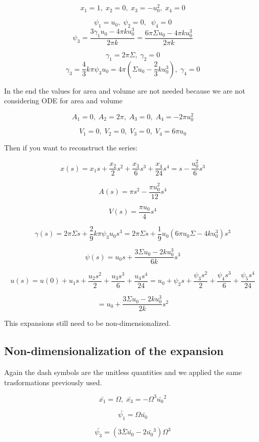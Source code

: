\documentclass[12pt]{article}
\begin{document}
$$
x_1 = 1 ,\; x_2 = 0 ,\; x_3 = - u_0^2 ,\; x_4 = 0
$$


$$
\psi_1 = u_0  ,\; \psi_2 = 0 ,\; \; \psi_4 = 0
$$
$$
\psi_3 = \frac{3\gamma_1 u_0 - 4 \pi k u_0^3}{2 \pi k } = \frac{6 \pi \Sigma u_0 - 4 \pi k u_0^3}{2 \pi k }
$$


$$
\gamma_1 = 2 \pi \Sigma ,\; \gamma_2 = 0 
$$
$$
\gamma_3 = \frac{4}{3} k \pi \psi_3 u_0 = 4 \pi (\Sigma u_0 - \frac{2}{3} k u_0^3) ,\; \gamma_4 = 0
$$

\alert{In the end the values for area and volume are not needed because we are not considering ODE for area and volume}

$$
A_1 = 0 ,\; A_2 =  2 \pi ,\; A_3 = 0 ,\; A_4 = - 2 \pi u_0^2
$$

$$
V_1 = 0 ,\; V_2 = 0 ,\; V_3 = 0 ,\; V_4 = 6 \pi u_0
$$


Then if you want to reconstruct the series:


$$
x(s)=x_1 s+\frac{x_2}{2}s^2+\frac{x_3}{6}s^3+\frac{x_4}{24} s^4 =s-\frac{u_0^2}{6}s^3 
$$

$$
A(s) = \pi s^2 - \frac{\pi u_0^2}{12}s^4
$$


$$
V(s) = \frac{\pi u_0}{4}s^4
$$


$$
\gamma(s) = 2 \pi \Sigma s + \frac{2}{9} k \pi \psi_3 u_0 s^3 = 2 \pi \Sigma s + \frac{1}{9}  u_0 (6 \pi u_0 \Sigma - 4 k u_0^3)s^3
$$

$$
\psi(s)=u_0s + \frac{3  \Sigma u_0 - 2  k u_0^3}{6 k }s^3
$$

$$
u(s)=u(0) + u_1s + \frac{u_2 s^2}{2} + \frac{u_3 s^3}{6} + \frac{u_4 s^4}{24} = u_0 + \psi_2 s + \frac{\psi_3 s^2}{2} + \frac{\psi_4 s^3}{6} + \frac{\psi_5 s^4}{24}
$$

$$
= u_0  + \frac{3  \Sigma u_0 - 2  k u_0^3}{2 k }s^2
$$

This expansions still need to be non-dimensionalized.

\subsection{Non-dimensionalization of the expansion}
Again the dash symbols are the unitless quantities and we applied the same trasformations previously used.


$$
\bar{x_1} = \Omega ,\;  \bar{x_3} = - \Omega^3 \bar{u_0}^2 
$$

$$
\bar{\psi_1}  = \Omega \bar{u_0}
$$

$$
\bar{\psi_3} = (3\bar{\Sigma} \bar{u_0} - 2 \bar{u_0}^3)\Omega^3
$$
\end{document}
